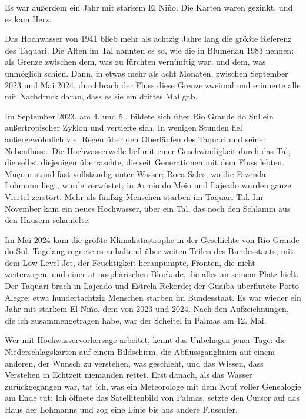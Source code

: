 \documentclass[
  ngerman,
  11pt,
  openany]{book}
\begin{document}
Es war außerdem ein Jahr mit starkem El Niño. Die Karten waren gezinkt,
und es kam Herz.

Das Hochwasser von 1941 blieb mehr als achtzig Jahre lang die größte
Referenz des Taquari. Die Alten im Tal nannten es so, wie die in
Blumenau 1983 nennen: als Grenze zwischen dem, was zu fürchten
vernünftig war, und dem, was unmöglich schien. Dann, in etwas mehr als
acht Monaten, zwischen September 2023 und Mai 2024, durchbrach der Fluss
diese Grenze zweimal und erinnerte alle mit Nachdruck daran, dass es sie
ein drittes Mal gab.

Im September 2023, am 4. und 5., bildete sich über Rio Grande do Sul ein
außertropischer Zyklon und vertiefte sich. In wenigen Stunden fiel
außergewöhnlich viel Regen über den Oberläufen des Taquari und seiner
Nebenflüsse. Die Hochwasserwelle lief mit einer Geschwindigkeit durch
das Tal, die selbst diejenigen überraschte, die seit Generationen mit
dem Fluss lebten. Muçum stand fast vollständig unter Wasser; Roca Sales,
wo die Fazenda Lohmann liegt, wurde verwüstet; in Arroio do Meio und
Lajeado wurden ganze Viertel zerstört. Mehr als fünfzig Menschen starben
im Taquari-Tal. Im November kam ein neues Hochwasser, über ein Tal, das
noch den Schlamm aus den Häusern schaufelte.

Im Mai 2024 kam die größte Klimakatastrophe in der Geschichte von Rio
Grande do Sul. Tagelang regnete es anhaltend über weiten Teilen des
Bundesstaats, mit dem Low-Level-Jet, der Feuchtigkeit heranpumpte,
Fronten, die nicht weiterzogen, und einer atmosphärischen Blockade, die
alles an seinem Platz hielt. Der Taquari brach in Lajeado und Estrela
Rekorde; der Guaíba überflutete Porto Alegre; etwa hundertachtzig
Menschen starben im Bundesstaat. Es war wieder ein Jahr mit starkem El
Niño, dem von 2023 und 2024. Nach den Aufzeichnungen, die ich
zusammengetragen habe, war der Scheitel in Palmas am 12. Mai.

Wer mit Hochwasservorhersage arbeitet, kennt das Unbehagen jener Tage:
die Niederschlagskarten auf einem Bildschirm, die Abflussganglinien auf
einem anderen, der Wunsch zu verstehen, was geschieht, und das Wissen,
dass Verstehen in Echtzeit niemanden rettet. Erst danach, als das Wasser
zurückgegangen war, tat ich, was ein Meteorologe mit dem Kopf voller
Genealogie am Ende tut: Ich öffnete das Satellitenbild von Palmas,
setzte den Cursor auf das Haus der Lohmanns und zog eine Linie bis ans
andere Flussufer.
\end{document}
